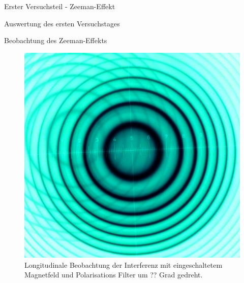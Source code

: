 \documentclass[pdftex, a4paper,11pt, twoside, ngerman]{report}
\begin{document}
\begin{chapter}{Erster Versuchsteil - Zeeman-Effekt}
\begin{section}{Auswertung des ersten Versuchstages}
\begin{subsection}{Beobachtung des Zeeman-Effekts}
        
        
        \begin{figure}[ht]
          \centering
          \begin{minipage}{0.48\textwidth}
            \centering
            \includegraphics[width=\textwidth]
                {Figures/parallel4inv.png}
            \caption{Longitudinale Beobachtung der Interferenz mit 
                eingeschaltetem Magnetfeld und Polarisations Filter um ?? Grad
                gedreht.}
            \label{fig:para4inv}
          \end{minipage}\quad
          \begin{minipage}{0.48\textwidth}
            \centering

\end{minipage}
\end{figure}
\end{subsection}
\end{section}
\end{chapter}
\end{document}
